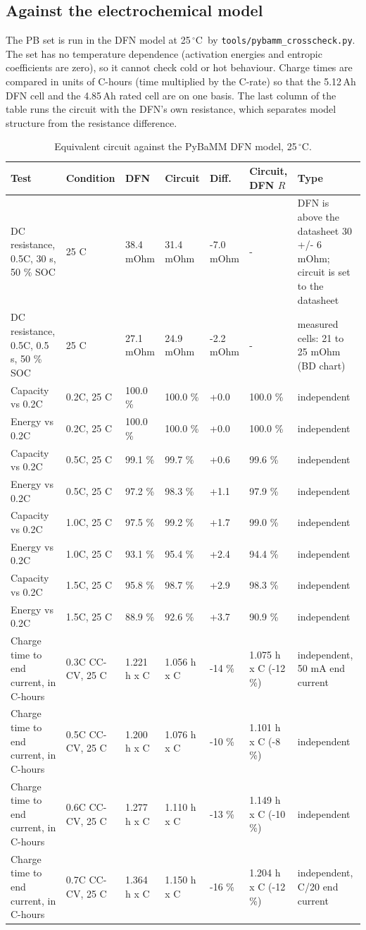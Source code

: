 \documentclass[11pt,a4paper]{article}
\newcommand{\degC}{\ensuremath{{}^{\circ}\mathrm{C}}}
\begin{document}
\subsection{Against the electrochemical model}
The PB set is run in the DFN model at 25\,\degC\ by \texttt{tools/pybamm\_crosscheck.py}. The set has no temperature dependence (activation energies and entropic coefficients are zero), so it cannot check cold or hot behaviour. Charge times are compared in units of C-hours (time multiplied by the C-rate) so that the 5.12\,Ah DFN cell and the 4.85\,Ah rated cell are on one basis. The last column of the table runs the circuit with the DFN's own resistance, which separates model structure from the resistance difference.
\begin{table}[H]
\centering\scriptsize
\begin{tabular}{@{}p{2.9cm}p{1.9cm}p{1.6cm}p{1.6cm}p{1.2cm}p{2.0cm}p{2.9cm}@{}}
\toprule
Test & Condition & DFN & Circuit & Diff. & Circuit, DFN $R$ & Type \\
\midrule
DC resistance, 0.5C, 30 s, 50 \% SOC & 25 C & 38.4 mOhm & 31.4 mOhm & -7.0 mOhm & - & DFN is above the datasheet 30 +/- 6 mOhm; circuit is set to the datasheet \\
DC resistance, 0.5C, 0.5 s, 50 \% SOC & 25 C & 27.1 mOhm & 24.9 mOhm & -2.2 mOhm & - & measured cells: 21 to 25 mOhm (BD chart) \\
Capacity vs 0.2C & 0.2C, 25 C & 100.0 \% & 100.0 \% & +0.0 & 100.0 \% & independent \\
Energy vs 0.2C & 0.2C, 25 C & 100.0 \% & 100.0 \% & +0.0 & 100.0 \% & independent \\
Capacity vs 0.2C & 0.5C, 25 C & 99.1 \% & 99.7 \% & +0.6 & 99.6 \% & independent \\
Energy vs 0.2C & 0.5C, 25 C & 97.2 \% & 98.3 \% & +1.1 & 97.9 \% & independent \\
Capacity vs 0.2C & 1.0C, 25 C & 97.5 \% & 99.2 \% & +1.7 & 99.0 \% & independent \\
Energy vs 0.2C & 1.0C, 25 C & 93.1 \% & 95.4 \% & +2.4 & 94.4 \% & independent \\
Capacity vs 0.2C & 1.5C, 25 C & 95.8 \% & 98.7 \% & +2.9 & 98.3 \% & independent \\
Energy vs 0.2C & 1.5C, 25 C & 88.9 \% & 92.6 \% & +3.7 & 90.9 \% & independent \\
Charge time to end current, in C-hours & 0.3C CC-CV, 25 C & 1.221 h x C & 1.056 h x C & -14 \% & 1.075 h x C (-12 \%) & independent, 50 mA end current \\
Charge time to end current, in C-hours & 0.5C CC-CV, 25 C & 1.200 h x C & 1.076 h x C & -10 \% & 1.101 h x C (-8 \%) & independent \\
Charge time to end current, in C-hours & 0.6C CC-CV, 25 C & 1.277 h x C & 1.110 h x C & -13 \% & 1.149 h x C (-10 \%) & independent \\
Charge time to end current, in C-hours & 0.7C CC-CV, 25 C & 1.364 h x C & 1.150 h x C & -16 \% & 1.204 h x C (-12 \%) & independent, C/20 end current \\
\bottomrule
\end{tabular}
\caption{Equivalent circuit against the PyBaMM DFN model, 25\,\degC.}
\end{table}
\end{document}
